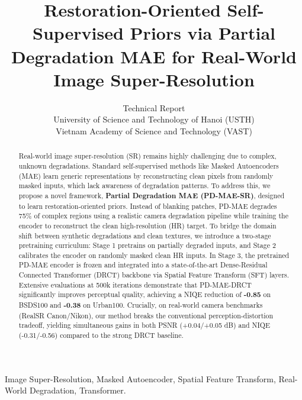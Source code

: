 \documentclass[journal,10pt,doublecolumn]{IEEEtran}
\begin{document}
\title{Restoration-Oriented Self-Supervised Priors via Partial Degradation MAE for Real-World Image Super-Resolution}

\author{Technical Report \\ 
University of Science and Technology of Hanoi (USTH) \\
Vietnam Academy of Science and Technology (VAST)}

\maketitle

\begin{abstract}
Real-world image super-resolution (SR) remains highly challenging due to complex, unknown degradations. Standard self-supervised methods like Masked Autoencoders (MAE) learn generic representations by reconstructing clean pixels from randomly masked inputs, which lack awareness of degradation patterns. To address this, we propose a novel framework, \textbf{Partial Degradation MAE (PD-MAE-SR)}, designed to learn restoration-oriented priors. Instead of blanking patches, PD-MAE degrades 75\% of complex regions using a realistic camera degradation pipeline while training the encoder to reconstruct the clean high-resolution (HR) target. To bridge the domain shift between synthetic degradations and clean textures, we introduce a two-stage pretraining curriculum: Stage 1 pretrains on partially degraded inputs, and Stage 2 calibrates the encoder on randomly masked clean HR inputs. In Stage 3, the pretrained PD-MAE encoder is frozen and integrated into a state-of-the-art Dense-Residual Connected Transformer (DRCT) backbone via Spatial Feature Transform (SFT) layers. Extensive evaluations at 500k iterations demonstrate that PD-MAE-DRCT significantly improves perceptual quality, achieving a NIQE reduction of \textbf{-0.85} on BSDS100 and \textbf{-0.38} on Urban100. Crucially, on real-world camera benchmarks (RealSR Canon/Nikon), our method breaks the conventional perception-distortion tradeoff, yielding simultaneous gains in both PSNR (+0.04/+0.05 dB) and NIQE (-0.31/-0.56) compared to the strong DRCT baseline.
\end{abstract}

\begin{IEEEkeywords}
Image Super-Resolution, Masked Autoencoder, Spatial Feature Transform, Real-World Degradation, Transformer.
\end{IEEEkeywords}
\end{document}

